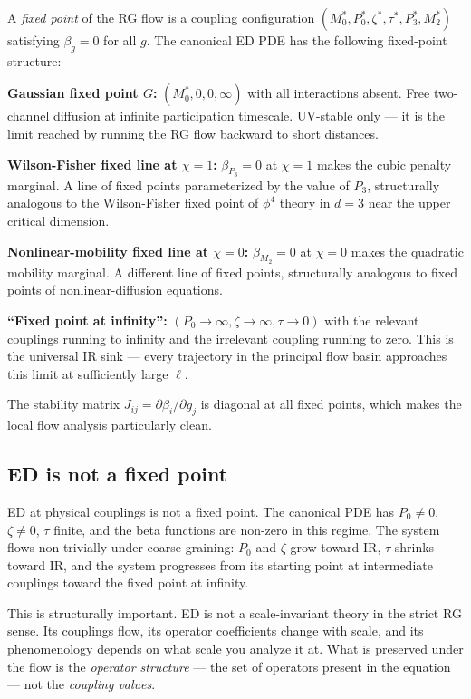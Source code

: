 \documentclass[11pt,a4paper]{article}
\begin{document}
A \emph{fixed point} of the RG flow is a coupling configuration $(M_0^*, P_0^*, \zeta^*, \tau^*, P_3^*, M_2^*)$ satisfying $\beta_g = 0$ for all $g$. The canonical ED PDE has the following fixed-point structure:

\textbf{Gaussian fixed point $G$:} $(M_0^*, 0, 0, \infty)$ with all interactions absent. Free two-channel diffusion at infinite participation timescale. UV-stable only --- it is the limit reached by running the RG flow backward to short distances.

\textbf{Wilson-Fisher fixed line at $\chi = 1$:} $\beta_{P_3} = 0$ at $\chi = 1$ makes the cubic penalty marginal. A line of fixed points parameterized by the value of $P_3$, structurally analogous to the Wilson-Fisher fixed point of $\phi^4$ theory in $d = 3$ near the upper critical dimension.

\textbf{Nonlinear-mobility fixed line at $\chi = 0$:} $\beta_{M_2} = 0$ at $\chi = 0$ makes the quadratic mobility marginal. A different line of fixed points, structurally analogous to fixed points of nonlinear-diffusion equations.

\textbf{``Fixed point at infinity'':} $(P_0 \to \infty, \zeta \to \infty, \tau \to 0)$ with the relevant couplings running to infinity and the irrelevant coupling running to zero. This is the universal IR sink --- every trajectory in the principal flow basin approaches this limit at sufficiently large $\ell$.

The stability matrix $J_{ij} = \partial \beta_i / \partial g_j$ is diagonal at all fixed points, which makes the local flow analysis particularly clean.

\subsection{ED is not a fixed point}

ED at physical couplings is not a fixed point. The canonical PDE has $P_0 \neq 0$, $\zeta \neq 0$, $\tau$ finite, and the beta functions are non-zero in this regime. The system flows non-trivially under coarse-graining: $P_0$ and $\zeta$ grow toward IR, $\tau$ shrinks toward IR, and the system progresses from its starting point at intermediate couplings toward the fixed point at infinity.

This is structurally important. ED is not a scale-invariant theory in the strict RG sense. Its couplings flow, its operator coefficients change with scale, and its phenomenology depends on what scale you analyze it at. What is preserved under the flow is the \emph{operator structure} --- the set of operators present in the equation --- not the \emph{coupling values}.
\end{document}

